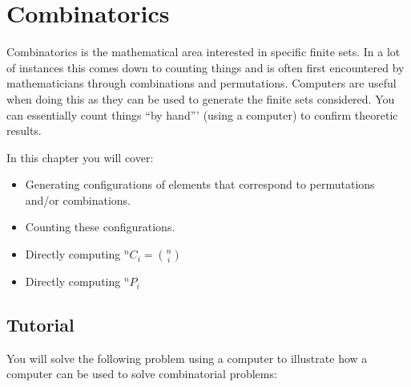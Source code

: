 \chapter{Combinatorics}
\label{chp:combinatorics}

Combinatorics is the mathematical area interested in specific finite sets. In a lot
of instances this comes down to counting things and is often first encountered
by mathematicians through combinations and permutations.
Computers are useful when doing this as they can be used to generate the finite
sets considered. You can essentially count things ``by hand''' (using a computer)
to confirm theoretic results.


\begin{note}
In this chapter you will cover:
\begin{itemize}
\item 

Generating configurations of elements that correspond to permutations and/or
combinations.

\item 

Counting these configurations.

\item 

Directly computing \(^n C_i={n \choose i}\)

\item 

Directly computing \(^n P_i\)

\end{itemize}
\end{note}





\section{Tutorial}
\label{\detokenize{tools-for-mathematics/05-combinations-permutations/tutorial/main:tutorial}}\label{\detokenize{tools-for-mathematics/05-combinations-permutations/tutorial/main::doc}}

You will solve the following problem using a computer to illustrate how a
computer can be used to solve combinatorial problems:


